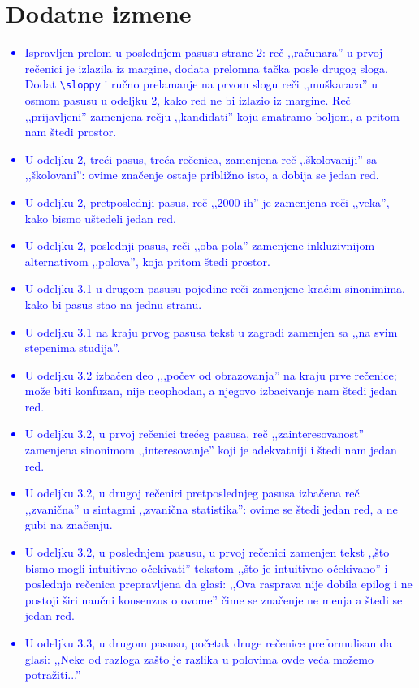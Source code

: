 \documentclass[a4paper]{report}
\newcommand{\odgovor}[1]{\textcolor{blue}{#1}}
\begin{document}
\chapter{Dodatne izmene}
\odgovor{
\begin{itemize}
\item Ispravljen prelom u poslednjem pasusu strane 2: reč ,,računara'' u prvoj rečenici je izlazila iz margine, dodata prelomna tačka posle drugog sloga. Dodat \texttt{\textbackslash{}sloppy} i ručno prelamanje na prvom slogu reči ,,muškaraca'' u osmom pasusu u odeljku 2, kako red ne bi izlazio iz margine. Reč ,,prijavljeni'' zamenjena rečju ,,kandidati'' koju smatramo boljom, a pritom nam štedi prostor.
\item U odeljku 2, treći pasus, treća rečenica, zamenjena reč ,,školovaniji'' sa ,,školovani'': ovime značenje ostaje približno isto, a dobija se jedan red.
\item {U odeljku 2, pretposlednji pasus, reč ,,2000-ih'' je zamenjena reči ,,veka'', kako bismo uštedeli jedan red.}
\item {U odeljku 2, poslednji pasus, reči ,,oba pola'' zamenjene inkluzivnijom alternativom ,,polova'', koja pritom štedi prostor.}
\item {U odeljku 3.1 u drugom pasusu pojedine reči zamenjene kraćim sinonimima, kako bi pasus stao na jednu stranu.}
\item {U odeljku 3.1 na kraju prvog pasusa tekst u zagradi zamenjen sa ,,na svim stepenima studija''.}
\item {U odeljku 3.2 izbačen deo ,,,počev od obrazovanja'' na kraju prve rečenice; može biti konfuzan, nije neophodan, a njegovo izbacivanje nam štedi jedan red.}
\item {U odeljku 3.2, u prvoj rečenici trećeg pasusa, reč ,,zainteresovanost'' zamenjena sinonimom ,,interesovanje'' koji je adekvatniji i štedi nam jedan red.}
\item {U odeljku 3.2, u drugoj rečenici pretposlednjeg pasusa izbačena reč ,,zvanična'' u sintagmi ,,zvanična statistika'': ovime se štedi jedan red, a ne gubi na značenju.}
\item {U odeljku 3.2, u poslednjem pasusu, u prvoj rečenici zamenjen tekst ,,što bismo mogli intuitivno očekivati'' tekstom ,,što je intuitivno očekivano'' i poslednja rečenica prepravljena da glasi: ,,Ova rasprava nije dobila epilog i ne postoji širi naučni konsenzus o ovome'' čime se značenje ne menja a štedi se jedan red.}
\item U odeljku 3.3, u drugom pasusu, početak druge rečenice preformulisan da glasi: ,,Neke od razloga zašto je razlika u polovima ovde veća možemo potražiti...''

\end{itemize}}
\end{document}
